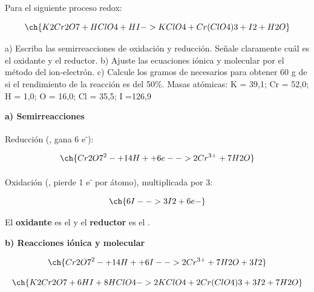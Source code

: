 \begin{exerciseEVAU}
    Para el siguiente proceso redox:

    \begin{equation*}
        \ch{K2Cr2O7 + HClO4 + HI -> KClO4 + Cr (ClO4)3 + I2 + H2O}
    \end{equation*}

    a) Escriba las semirreacciones de oxidación y reducción. Señale claramente cuál es el oxidante y el reductor. b) Ajuste las ecuaciones iónica y molecular por el método del ion-electrón. c) Calcule los gramos de  necesarios para obtener 60 g de  si el rendimiento de la reacción es del 50\%. Masas atómicas: K = 39,1; Cr = 52,0; H = 1,0; O = 16,0; Cl = 35,5; I =126,9

    \begin{solu}


        \textbf{a) Semirreacciones}

        Reducción (, gana 6 e\textsuperscript{-}):

        \begin{equation*}
            \ch{Cr2O7^2- + 14 H+ + 6 e- -> 2 Cr^{3+} + 7 H2O}
        \end{equation*}

        Oxidación (, pierde 1 e\textsuperscript{-} por átomo), multiplicada por 3:

        \begin{equation*}
            \ch{6 I- -> 3 I2 + 6 e-}
        \end{equation*}

        El \textbf{oxidante} es el  y el \textbf{reductor} es el .

        \textbf{b) Reacciones iónica y molecular}

        \begin{equation*}
            \ch{Cr2O7^2- + 14 H+ + 6 I- -> 2 Cr^{3+} + 7 H2O + 3 I2}
        \end{equation*}

        \begin{equation*}
            \ch{K2Cr2O7 + 6 HI + 8 HClO4 -> 2 KClO4 + 2 Cr(ClO4)3 + 3 I2 + 7 H2O}
        \end{equation*}


\end{solu}
\end{exerciseEVAU}
